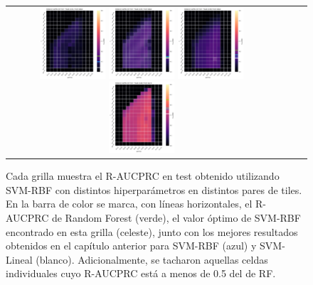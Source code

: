 \begin{figure}[h!]
\begin{tabular}{cccc}
     \includegraphics[width=0.25\textwidth]{Kap8/heatmap_train=b234_test=b360.png}  
  \includegraphics[width=0.25\textwidth]{Kap8/heatmap_train=b261_test=b360.png}
  \includegraphics[width=0.25\textwidth]{Kap8/heatmap_train=b278_test=b360.png} 
   \includegraphics[width=0.25\textwidth]{Kap8/heatmap_train=b360_test=b278.png} \\

\end{tabular}
\caption{Cada grilla muestra el R-AUCPRC en test obtenido utilizando SVM-RBF con distintos hiperparámetros en distintos pares de tiles. En la barra de color se marca, con líneas horizontales, el R-AUCPRC de Random Forest (verde), el valor óptimo de SVM-RBF encontrado en esta grilla (celeste), junto con los mejores resultados obtenidos en el capítulo anterior para SVM-RBF (azul) y SVM-Lineal (blanco). Adicionalmente, se tacharon aquellas celdas individuales cuyo R-AUCPRC está a menos de 0.5 del de RF. }
\label{fig:poder_predictivo}
\end{figure}

